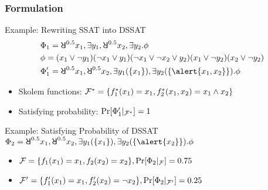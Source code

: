 \begin{frame}
  \frametitle{Formulation}
  \begin{block}{Example: Rewriting SSAT into DSSAT}
    \abovedisplayskip=0pt
    \belowdisplayskip=0pt
    \begin{align*}
       & \Qf_1=\random{0.5} x_1, \exists y_1, \random{0.5} x_2, \exists y_2. \pf                                 \\
       & \pf=(x_1 \lor \lnot y_1)
      (\lnot x_1 \lor y_1)
      (\lnot x_1 \lor \lnot x_2 \lor y_2)
      (x_1 \lor \lnot y_2)
      (x_2 \lor \lnot y_2)                                                                                       \\
       & \Qf_1' = \random{0.5} x_1, \random{0.5} x_2, \exists y_1(\{x_1\}), \exists y_2(\{\alert{x_1,x_2}\}).\pf
    \end{align*}
    \pause
    \begin{itemize}
      \item Skolem functions: $\mathcal{F}^*=\{f^*_1(x_1)=x_1,f^*_2(x_1,x_2)=x_1 \land x_2\}$
            \pause
      \item Satisfying probability: $\Pr[\Phi_1'|_{\mathcal{F}^*}]=1$
    \end{itemize}
  \end{block}
  \pause
  \begin{block}{Example: Satisfying Probability of DSSAT}
    \abovedisplayskip=0pt
    $\Qf_2 = \random{0.5} x_1, \random{0.5} x_2, \exists y_1(\{x_1\}), \exists y_2(\{\alert{x_2}\}).\pf$
    \pause
    \begin{itemize}
      \item $\mathcal{F}=\{f_1(x_1)=x_1,f_2(x_2)=x_2\},\Pr[\Phi_2|_{\mathcal{F}}]=0.75$\pause
      \item $\mathcal{F}'=\{f_1'(x_1)=x_1,f_2'(x_2)=\neg x_2\},\Pr[\Phi_2|_{\mathcal{F}'}]=0.25$
    \end{itemize}
  \end{block}
\end{frame}